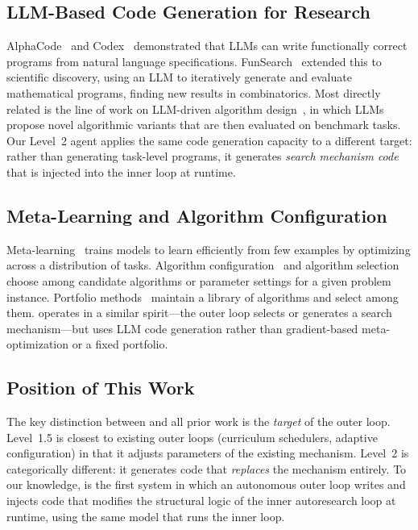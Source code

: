 \subsection{LLM-Based Code Generation for Research}

AlphaCode~\citep{li2022competition} and Codex~\citep{chen2021evaluating}
demonstrated that LLMs can write functionally correct programs from natural
language specifications.
FunSearch~\citep{romera2024mathematical} extended this to scientific
discovery, using an LLM to iteratively generate and evaluate mathematical
programs, finding new results in combinatorics.
Most directly related is the line of work on LLM-driven algorithm
design~\citep{liu2024evolution,lehman2023evolution}, in which LLMs propose
novel algorithmic variants that are then evaluated on benchmark tasks.
Our Level~2 agent applies the same code generation capacity to a different
target: rather than generating task-level programs, it generates
\emph{search mechanism code} that is injected into the inner loop at runtime.

\subsection{Meta-Learning and Algorithm Configuration}

Meta-learning~\citep{hospedales2021meta} trains models to learn efficiently
from few examples by optimizing across a distribution of tasks.
Algorithm configuration~\citep{hutter2011smac} and algorithm
selection~\citep{rice1976algorithm} choose among candidate algorithms or
parameter settings for a given problem instance.
Portfolio methods~\citep{xu2008satzilla} maintain a library of algorithms and
select among them.
\methodname{} operates in a similar spirit---the outer loop selects or
generates a search mechanism---but uses LLM code generation rather than
gradient-based meta-optimization or a fixed portfolio.

\subsection{Position of This Work}

The key distinction between \methodname{} and all prior work is the
\emph{target} of the outer loop.
Level~1.5 is closest to existing outer loops (curriculum schedulers, adaptive
configuration) in that it adjusts parameters of the existing mechanism.
Level~2 is categorically different: it generates code that \emph{replaces} the
mechanism entirely.
To our knowledge, \methodname{} is the first system in which an autonomous
outer loop writes and injects code that modifies the structural logic of the
inner autoresearch loop at runtime, using the same model that runs the inner
loop.
